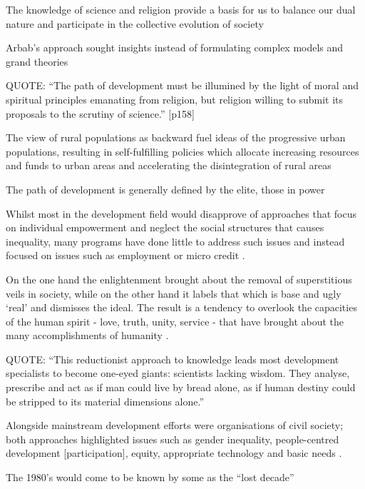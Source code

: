 The knowledge of science and religion provide a basis for us to balance our dual nature and participate in the collective evolution of society \citep{Arbab2000}

Arbab's approach sought insights instead of formulating complex models and grand theories \citep{Arbab2000}

QUOTE: “The path of development must be illumined by the light of moral and spiritual principles emanating from religion, but religion willing to submit its proposals to the scrutiny of science.” [p158] \citep{Arbab2000}

The view of rural populations as backward fuel ideas of the progressive urban populations, resulting in self-fulfilling policies which allocate increasing resources and funds to urban areas and accelerating the disintegration of rural areas \citep{Arbab2000}

The path of development is generally defined by the elite, those in power \citep{Arbab2000}

Whilst most in the development field would disapprove of approaches that focus on individual empowerment and neglect the social structures that causes inequality, many programs have done little to address such issues and instead focused on issues such as employment or micro credit \citep{Arbab2000}.

On the one hand the enlightenment brought about the removal of superstitious veils in society, while on the other hand it labels that which is base and ugly `real' and dismisses the ideal. The result is a tendency to overlook the capacities of the human spirit - love, truth, unity, service - that have brought about the many accomplishments of humanity \citep{Arbab2000}.



QUOTE: “This reductionist approach to knowledge leads most development specialists to become one-eyed giants: scientists lacking wisdom. They analyse, prescribe and act as if man could live by bread alone, as if human destiny could be stripped to its material dimensions alone.” \cite[][p481]{Goulet1980}

Alongside mainstream development efforts were organisations of civil society; both approaches highlighted issues such as gender inequality, people-centred development [participation], equity, appropriate technology and basic needs \citep{Arbab2000}.

The 1980's would come to be known by some as the “lost decade” \cite{Singer1989,Easterly2001}


